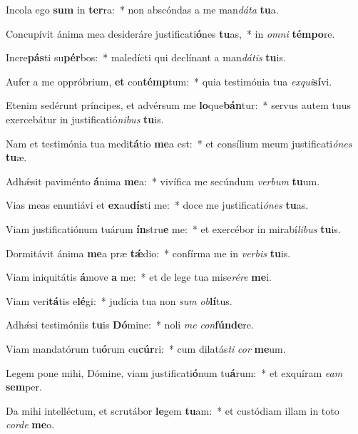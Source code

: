 \item Incola ego \textbf{sum} in \textbf{ter}ra:~* non abscóndas a me man\textit{dá}\textit{ta} \textbf{tu}a.
\item Concupívit ánima mea desideráre justificati\textbf{ó}nes \textbf{tu}as,~* in \textit{om}\textit{ni} \textbf{tém}\textbf{po}re.
\item Incre\textbf{pás}ti su\textbf{pér}bos:~* maledícti qui declínant a man\textit{dá}\textit{tis} \textbf{tu}is.
\item Aufer a me oppróbrium, \textbf{et} con\textbf{témp}tum:~* quia testimónia tua \textit{ex}\textit{qui}\textbf{sí}vi.
\item Etenim sedérunt príncipes, et advérsum me \textbf{lo}que\textbf{bán}tur:~* servus autem tuus exercebátur in justificatió\textit{ni}\textit{bus} \textbf{tu}is.
\item Nam et testimónia tua medi\textbf{tá}tio \textbf{me}a est:~* et consílium meum justificati\textit{ó}\textit{nes} \textbf{tu}æ.
\item Adhǽsit paviménto \textbf{á}nima \textbf{me}a:~* vivífica me secúndum \textit{ver}\textit{bum} \textbf{tu}um.
\item Vias meas enuntiávi et \textbf{ex}au\textbf{dís}ti me:~* doce me justificati\textit{ó}\textit{nes} \textbf{tu}as.
\item Viam justificatiónum tuárum \textbf{ín}stru\textbf{e} me:~* et exercébor in mirabí\textit{li}\textit{bus} \textbf{tu}is.
\item Dormitávit ánima \textbf{me}a præ \textbf{tǽ}dio:~* confírma me in \textit{ver}\textit{bis} \textbf{tu}is.
\item Viam iniquitátis \textbf{á}move \textbf{a} me:~* et de lege tua mise\textit{ré}\textit{re} \textbf{me}i.
\item Viam veri\textbf{tá}tis e\textbf{lé}gi:~* judícia tua non \textit{sum} \textit{ob}\textbf{lí}tus.
\item Adhǽsi testimóniis \textbf{tu}is \textbf{Dó}mine:~* noli \textit{me} \textit{con}\textbf{fún}\textbf{de}re.
\item Viam mandatórum tu\textbf{ó}rum cu\textbf{cúr}ri:~* cum dilatás\textit{ti} \textit{cor} \textbf{me}um.
\item Legem pone mihi, Dómine, viam justificati\textbf{ó}num tu\textbf{á}rum:~* et exquíram \textit{e}\textit{am} \textbf{sem}per.
\item Da mihi intelléctum, et scrutábor \textbf{le}gem \textbf{tu}am:~* et custódiam illam in toto \textit{cor}\textit{de} \textbf{me}o.
